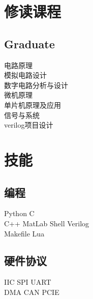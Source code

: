 \documentclass[]{deedy-resume-openfont}
\begin{document}
\begin{minipage}[t]{0.25\textwidth}
\section{修读课程}
\subsection{Graduate}
电路原理 \\
模拟电路设计 \\
数字电路分析与设计 \\
微机原理 \\
单片机原理及应用 \\
信号与系统 \\
verilog项目设计 \\
\sectionsep

\section{技能}
\sectionsep
\subsection{编程}
Python \textbullet{} C \\
C++ \textbullet{} MatLab \textbullet{} Shell \textbullet{} Verilog \\
Makefile \textbullet{} Lua \\ 
\sectionsep

\subsection{硬件协议}
IIC \textbullet{} SPI \textbullet{} UART \\
DMA \textbullet{} CAN \textbullet{} PCIE \\
\sectionsep


\end{minipage}
\end{document}
